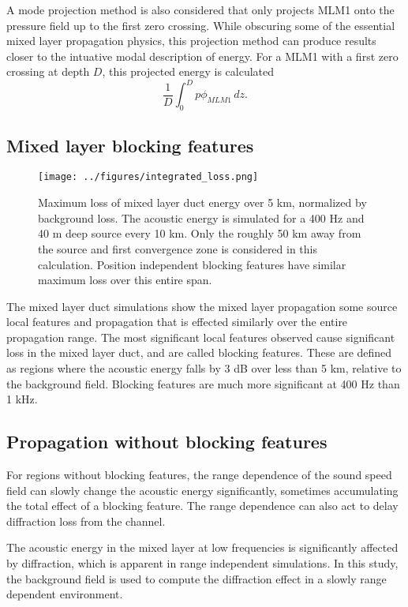 \documentclass[preprint,NumberedRefs]{JASA}
\begin{document}
A mode projection method is also considered that only projects MLM1 onto the pressure field up to the first zero crossing. While obscuring some of the essential mixed layer propagation physics, this projection method can produce results closer to the intuative modal description of energy. For a MLM1 with a first zero crossing at depth $D$, this projected energy is calculated
\begin{equation}
    \frac{1}{D} \int^{D}_0 p \phi_{MLM1} \,  dz.
\end{equation}

\subsection{Mixed layer blocking features}\label{sec:blocking}
\begin{figure}
\texttt{[image: ../figures/integrated\_loss.png]}
    \caption{Maximum loss of mixed layer duct energy over 5 km, normalized by background loss. The acoustic energy is simulated for a 400 Hz and 40 m deep source every 10 km. Only the roughly 50 km away from the source and first convergence zone is considered in this calculation. Position independent blocking features have similar maximum loss over this entire span.}
    \label{fig:bg_eng}
\end{figure}

The mixed layer duct simulations show the mixed layer propagation some source  local features and propagation that is effected similarly over the entire propagation range. The most significant local features observed cause significant loss in the mixed layer duct, and are called blocking features. These are defined as regions where the acoustic energy falls by 3 dB over less than 5 km, relative to the background field. Blocking features are much more significant at 400 Hz than 1 kHz.

\subsection{Propagation without blocking features}
For regions without blocking features, the range dependence of the sound speed field can slowly change the acoustic energy significantly, sometimes accumulating the total effect of a blocking feature. The range dependence can also act to delay diffraction loss from the channel.

The acoustic energy in the mixed layer at low frequencies is significantly affected by diffraction, which is apparent in range independent simulations. In this study, the background field is used to compute the diffraction effect in a slowly range dependent environment.



\end{document}
